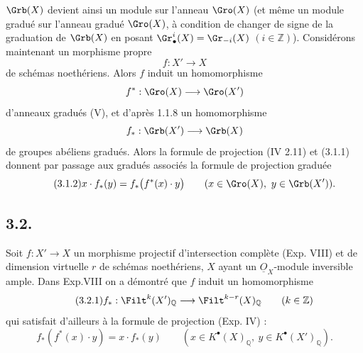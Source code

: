 
\(\Grb(X)\)
devient ainsi un module sur l'anneau \(\Gro(X)\) (et même un module gradué sur l'anneau gradué \(\Gro(X)\), à condition de changer de signe de la graduation de \(\Grb(X)\) en posant \(\Gr^i_\bullet(X)=\Gr_{-i}(X)\) \((i\in\mathbb Z)\)).
Considérons maintenant un morphisme propre
\[
 f:X'\longrightarrow X
\]
de schémas noethériens. Alors \(f\) induit un homomorphisme
\[
 f^*:\Gro(X)\longrightarrow\Gro(X')
\]
d'anneaux gradués (V), et d'après 1.1.8 un homomorphisme
\[
 f_*:\Grb(X')\longrightarrow\Grb(X)
\]
de groupes abéliens gradués. Alors la formule de projection (IV 2.11) et (3.1.1) donnent par passage aux gradués associés la formule de projection graduée
\begin{equation}\tag{3.1.2}
 x\cdot f_*(y)=f_*\bigl(f^*(x)\cdot y\bigr)
 \qquad (x\in\Gro(X),\ y\in\Grb(X')).
\end{equation}

\subsection*{3.2.}
Soit \(f:X'\to X\) un morphisme projectif d'intersection complète (Exp. VIII) et de dimension virtuelle \(r\) de schémas noethériens, \(X\) ayant un \(\underline{O}_X\)-module inversible ample. Dans Exp.VIII on a démontré que \(f\) induit un homomorphisme
\begin{equation}\tag{3.2.1}
 f_*:\Filt^k(X')_{\mathbb Q}\longrightarrow\Filt^{k-r}(X)_{\mathbb Q}\qquad(k\in\mathbb Z)
\end{equation}
qui satisfait d'ailleurs à la formule de projection (Exp. IV) :
\begin{equation}\tag{3.2.2}
 f_*(f^*(x)\cdot y)=x\cdot f_*(y)
 \qquad (x\in K^{\bullet}(X)_{\mathbb Q},\ y\in K^{\bullet}(X')_{\mathbb Q}).
\end{equation}
